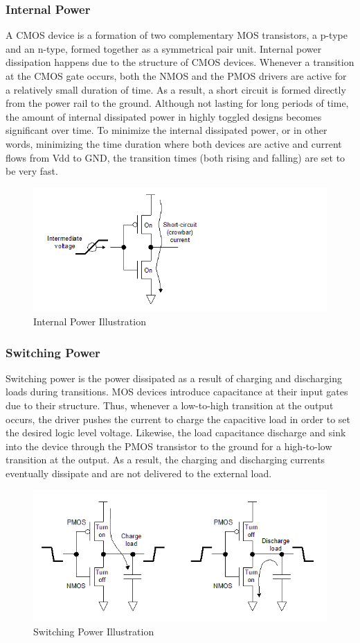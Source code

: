 \subsubsection{Internal Power}
A CMOS device is a formation of two complementary MOS transistors,
a p-type and an n-type, formed together as a symmetrical
pair unit. 
Internal power dissipation happens due to the structure of
CMOS devices. 
Whenever a transition at the CMOS gate occurs, 
both the NMOS and the PMOS drivers are active for a 
relatively small duration of time. As a result, 
a short circuit is formed directly from the power rail to the ground. 
Although not lasting for long periods of time, 
the amount of internal dissipated power in highly toggled 
designs becomes significant over time. 
To minimize the internal dissipated power, 
or in other words, minimizing the time duration where 
both devices are active and current flows from Vdd to GND, 
the transition times (both rising and falling) are set to be very fast.

\begin{figure}[H]
    \centering
    \includegraphics[width=0.75\linewidth]{Features/images/int_power_schem}
    \caption{Internal Power Illustration}\label{fig:int_power_schem}
\end{figure}

\subsubsection{Switching Power}
Switching power is the power dissipated as a result 
of charging and discharging loads during transitions. 
MOS devices introduce capacitance at their input gates 
due to their structure. 
Thus, whenever a low-to-high transition at the output occurs, 
the driver pushes the current to charge the capacitive 
load in order to set the desired logic level voltage. 
Likewise, the load capacitance discharge and sink into the 
device through the PMOS transistor to the ground 
for a high-to-low transition at the output. 
As a result, the charging and discharging currents 
eventually dissipate and are not delivered to the external load.

\begin{figure}[H]
    \centering
    \includegraphics[width=0.75\linewidth]{Features/images/sw_power_schem}
    \caption{Switching Power Illustration}\label{fig:sw_power_schem}
\end{figure}